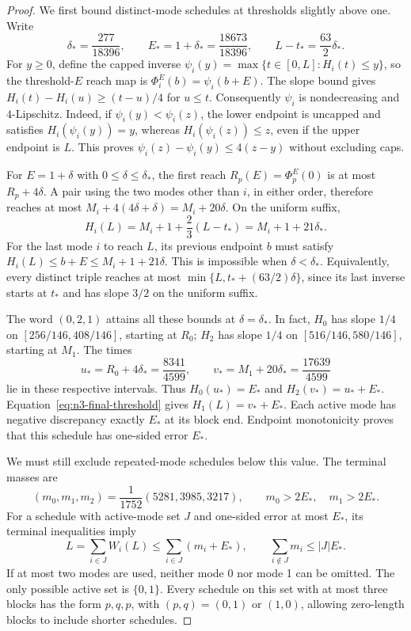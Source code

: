 \begin{proof}
We first bound distinct-mode schedules at thresholds slightly above one.
Write
\[
 \delta_*=\frac{277}{18396},\qquad E_*=1+\delta_*
 =\frac{18673}{18396},\qquad
 L-t_*=\frac{63}{2}\delta_*.
\]
For $y\ge0$, define the capped inverse
$\psi_i(y)=\max\{t\in[0,L]:H_i(t)\le y\}$, so the threshold-$E$
reach map is $\Phi_i^E(b)=\psi_i(b+E)$. The slope bound gives
$H_i(t)-H_i(u)\ge(t-u)/4$ for $u\le t$. Consequently $\psi_i$ is
nondecreasing and $4$-Lipschitz. Indeed, if $\psi_i(y)<\psi_i(z)$,
the lower endpoint is uncapped and satisfies $H_i(\psi_i(y))=y$,
whereas $H_i(\psi_i(z))\le z$, even if the upper endpoint is $L$.
This proves $\psi_i(z)-\psi_i(y)\le4(z-y)$ without excluding caps.

For $E=1+\delta$ with $0\le\delta\le\delta_*$, the first reach
$R_p(E)=\Phi_p^E(0)$ is at most $R_p+4\delta$. A pair using the two
modes other than $i$, in either order, therefore reaches at most
$M_i+4(4\delta+\delta)=M_i+20\delta$.
On the uniform suffix,
\begin{equation}\label{eq:n3-final-threshold}
 H_i(L)=M_i+1+\frac23(L-t_*)=M_i+1+21\delta_*.
\end{equation}
For the last mode $i$ to reach $L$, its previous endpoint $b$ must satisfy
$H_i(L)\le b+E\le M_i+1+21\delta$. This is impossible when
$\delta<\delta_*$. Equivalently, every distinct triple reaches at most
$\min\{L,t_*+(63/2)\delta\}$, since its last inverse starts at $t_*$
and has slope $3/2$ on the uniform suffix.

The word $(0,2,1)$ attains all these bounds at $\delta=\delta_*$. In fact,
$H_0$ has slope $1/4$ on $[256/146,408/146]$, starting at $R_0$;
$H_2$ has slope $1/4$ on $[516/146,580/146]$, starting at $M_1$.
The times
\begin{equation}\label{eq:n3-optimal-times}
 u_*=R_0+4\delta_*=\frac{8341}{4599},\qquad
 v_*=M_1+20\delta_*=\frac{17639}{4599}
\end{equation}
lie in these respective intervals. Thus $H_0(u_*)=E_*$ and
$H_2(v_*)=u_*+E_*$. Equation~\eqref{eq:n3-final-threshold} gives
$H_1(L)=v_*+E_*$. Each active mode has negative discrepancy exactly
$E_*$ at its block end. Endpoint monotonicity proves that this schedule
has one-sided error $E_*$.

We must still exclude repeated-mode schedules below this value. The terminal
masses are
\begin{equation}\label{eq:n3-terminal}
 (m_0,m_1,m_2)=\frac1{1752}(5281,3985,3217),
 \qquad m_0>2E_*,\quad m_1>2E_*.
\end{equation}
For a schedule with active-mode set $J$ and one-sided error at most $E_*$,
its terminal inequalities imply
\[
 L=\sum_{i\in J}W_i(L)\le\sum_{i\in J}(m_i+E_*),
 \qquad \sum_{i\notin J}m_i\le |J|E_*.
\]
If at most two modes are used, neither mode 0 nor mode 1 can be omitted.
The only possible active set is $\{0,1\}$. Every schedule on this set
with at most three blocks has the form $p,q,p$, with $(p,q)=(0,1)$ or
$(1,0)$, allowing zero-length blocks to include shorter schedules.


\end{proof}
